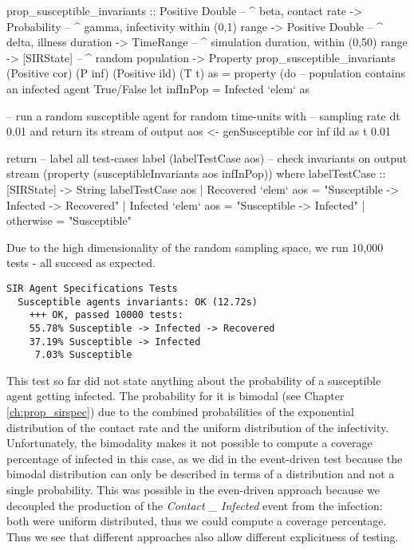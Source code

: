 \begin{HaskellCode}
prop_susceptible_invariants :: Positive Double  -- ^ beta, contact rate
                            -> Probability      -- ^ gamma, infectivity within (0,1) range
                            -> Positive Double  -- ^ delta, illness duration
                            -> TimeRange        -- ^ simulation duration, within (0,50) range
                            -> [SIRState]       -- ^ random population
                            -> Property
prop_susceptible_invariants
      (Positive cor) (P inf) (Positive ild) (T t) as = property (do  
    -- population contains an infected agent True/False
    let infInPop = Infected `elem` as

    -- run a random susceptible agent for random time-units with 
    -- sampling rate dt 0.01 and return its stream of output
    aos <- genSusceptible cor inf ild as t 0.01

    return 
        -- label all test-cases
        label (labelTestCase aos) 
        -- check invariants on output stream
        (property (susceptibleInvariants aos infInPop))
  where
    labelTestCase :: [SIRState] -> String
    labelTestCase aos
      | Recovered `elem` aos = "Susceptible -> Infected -> Recovered"
      | Infected `elem` aos  = "Susceptible -> Infected"
      | otherwise            = "Susceptible"
\end{HaskellCode}

Due to the high dimensionality of the random sampling space, we run 10,000 tests - all succeed as expected.

\begin{verbatim}
SIR Agent Specifications Tests
  Susceptible agents invariants: OK (12.72s)
    +++ OK, passed 10000 tests:
    55.78% Susceptible -> Infected -> Recovered
    37.19% Susceptible -> Infected
     7.03% Susceptible
\end{verbatim}

This test so far did not state anything about the probability of a susceptible agent getting infected. The probability for it is bimodal (see Chapter \ref{ch:prop_sirspec}) due to the combined probabilities of the exponential distribution of the contact rate and the uniform distribution of the infectivity. Unfortunately, the bimodality makes it not possible to compute a coverage percentage of infected in this case, as we did in the event-driven test because the bimodal distribution can only be described in terms of a distribution and not a single probability. This was possible in the even-driven approach because we decoupled the production of the \textit{Contact \_ Infected} event from the infection: both were uniform distributed, thus we could compute a coverage percentage. Thus we see that different approaches also allow different explicitness of testing.

